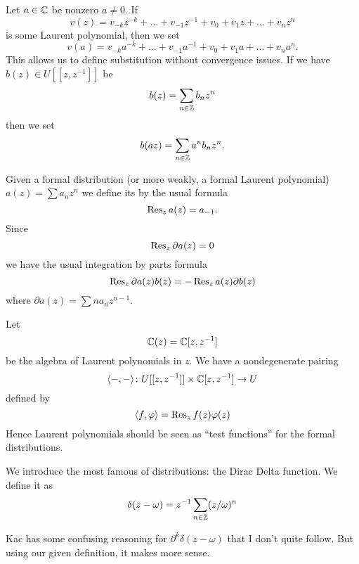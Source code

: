 Let $a\in\CC$ be nonzero $a\neq 0$. If 
\begin{equation}
v(z)=v_{-k}z^{-k}+\dots+v_{-1}z^{-1}+v_{0}+v_{1}z+\dots+v_{n}z^{n}
\end{equation}
is some Laurent polynomial, then we set
\begin{equation}
v(a)=v_{-k}a^{-k}+\dots+v_{-1}a^{-1}+v_{0}+v_{1}a+\dots+v_{n}a^{n}.
\end{equation}
This allows us to define substitution without convergence issues. If we have
$b(z)\in U[[z,z^{-1}]]$ be
\begin{equation}
b(z) = \sum_{n\in\ZZ}b_{n}z^{n}
\end{equation}
then we set
\begin{equation}
b(az)=\sum_{n\in\ZZ}a^{n}b_{n}z^{n}.
\end{equation}

\M
Given a formal distribution (or more weakly, a formal Laurent polynomial)
$a(z) = \sum a_{n}z^{n}$ we define its  by the usual
formula
\begin{equation}
\Res[z]{a(z)} = a_{-1}.
\end{equation}
Since
\begin{equation}
\Res[z]{\partial a(z)}=0
\end{equation}
we have the usual integration by parts formula
\begin{equation}
\Res[z]{\partial a(z)b(z)}=-\Res[z]{a(z)\partial b(z)}
\end{equation}
where $\partial a(z)=\sum na_{n}z^{n-1}$.

\M
Let
\begin{equation}
\CC(z)=\CC[z,z^{-1}]
\end{equation}
be the algebra of Laurent polynomials in $z$. We have a nondegenerate
pairing
\begin{equation}
\<-,-\>\colon U[[z,z^{-1}]]\times\CC[z,z^{-1}]\to U
\end{equation}
defined by
\begin{equation}
\<f,\varphi\>=\Res[z]{f(z)\varphi(z)}
\end{equation}
Hence Laurent polynomials should be seen as ``test functions'' for the
formal distributions.

\M
We introduce the most famous of distributions: the Dirac Delta
function. We define it as
\begin{equation}
\delta(z-\omega)
=z^{-1}\sum_{n\in\ZZ}(z/\omega)^{n}
\end{equation}
\begin{rmk}
Kac has some confusing reasoning for $\partial^{k}\delta(z-\omega)$ that
I don't quite follow. But using our given definition, it makes more sense.
\end{rmk}

